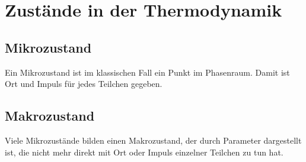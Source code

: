 \documentclass[ngerman]{scrartcl}
\begin{document}
\section{Zustände in der Thermodynamik}

\subsection*{Mikrozustand}
Ein Mikrozustand ist im klassischen Fall ein Punkt im Phasenraum. Damit ist Ort und Impuls für jedes Teilchen gegeben.

\subsection*{Makrozustand}
Viele Mikrozustände bilden einen Makrozustand, der durch Parameter dargestellt ist, die nicht mehr direkt mit Ort oder Impuls einzelner Teilchen zu tun hat. 


\newpage
\printbibliography
\end{document}
